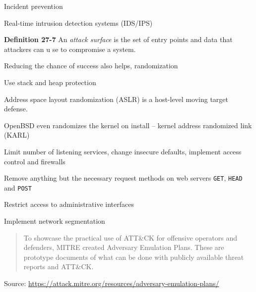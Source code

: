 \documentclass[Screen16to9,17pt]{foils}
\begin{document}

\begin{list2}
\item Incident prevention
\item Real-time intrusion detection systems (IDS/IPS)
\item {\bf Definition 27-7} An \emph{attack surface} is the set of entry points and data that attackers can u
se to compromise a system.
\item Reducing the chance of success also helps, randomization
\item Use stack and heap protection
\item Address space layout randomization (ASLR) is a host-level moving target defense.
\item OpenBSD even randomizes the kernel on install -- kernel address randomized link (KARL)
\item Limit number of listening services, change insecure defaults, implement access control and firewalls
\item Remove anything but the necessary request methods on web servers \verb+GET+, \verb+HEAD+ and \verb+POST+
\item Restrict access to administrative interfaces
\item Implement network segmentation
\end{list2}




\begin{quote}
To showcase the practical use of ATT\&CK for offensive operators and defenders, MITRE created Adversary Emulation Plans. These are prototype documents of what can be done with publicly available threat reports and ATT\&CK.
\end{quote}
Source: \url{https://attack.mitre.org/resources/adversary-emulation-plans/}


\end{document}
